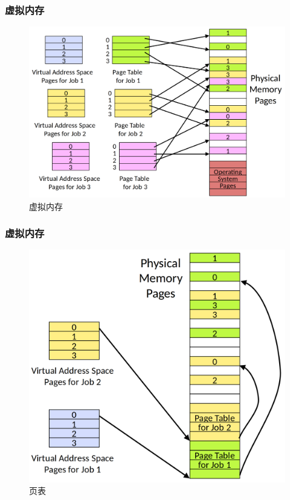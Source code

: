 \documentclass[UTF8]{ctexbeamer}
\begin{document}
\begin{frame}
	
	\frametitle{虚拟内存}
	
	\begin{figure}
		\centering
		\includegraphics[width=0.85\linewidth]{vm}
		\caption{虚拟内存}
	\end{figure}
	
\end{frame}

\begin{frame}
	
	\frametitle{虚拟内存}
	
	\begin{figure}
		\centering
		\includegraphics[width=0.65\linewidth]{vm-pagetable}
		\caption{页表}
	\end{figure}
	
\end{frame}
\end{document}
